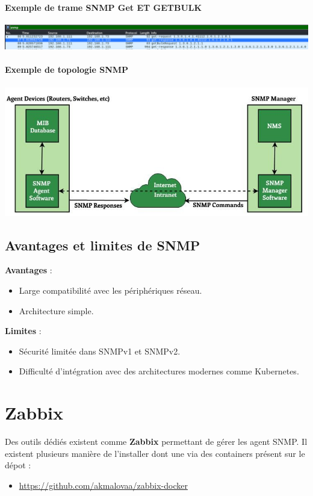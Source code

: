\documentclass[french, 12pt]{article}%
\newcommand{\itemE}{\item[$\bullet$]}
\begin{document}
\paragraph{Exemple de trame SNMP Get ET GETBULK}
\begin{center}
\includegraphics[scale=0.7]{./ressource/exSnmpGet}
\end{center}


\paragraph{Exemple de topologie SNMP}
\begin{center}
\includegraphics[scale=0.7]{./ressource/SNMP_archi}
\end{center}


\subsection*{Avantages et limites de SNMP}
\textbf{Avantages} :
\begin{itemize}
    \itemE Large compatibilité avec les périphériques réseau.
    \itemE Architecture simple.
\end{itemize}
\textbf{Limites} :
\begin{itemize}
    \itemE Sécurité limitée dans SNMPv1 et SNMPv2.
    \itemE Difficulté d’intégration avec des architectures modernes comme Kubernetes.
\end{itemize}

\section{Zabbix}
Des outils dédiés existent comme \textbf{Zabbix} permettant de gérer les agent SNMP. Il existent plusieurs manière de l'installer dont une via des containers présent sur le dépot : 
\begin{itemize}
\itemE \href{https://github.com/akmalovaa/zabbix-docker}{https://github.com/akmalovaa/zabbix-docker}
\end{itemize}
\end{document}
